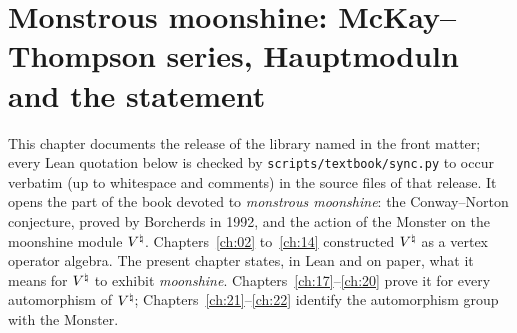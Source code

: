 \chapter{Monstrous moonshine: McKay--Thompson series, Hauptmoduln and the statement}\label{ch:16}

\providecommand{\chsixteenH}{\mathbb{H}}
\providecommand{\chsixteenR}{\mathbb{R}}
\providecommand{\chsixteenM}{\mathbb{M}}
\providecommand{\chsixteenSL}{\mathrm{SL}_2(\mathbb{Z})}
\providecommand{\chsixteenSLR}{\mathrm{SL}_2(\mathbb{R})}
\providecommand{\chsixteenGLR}{\mathrm{GL}_2(\mathbb{R})}
\providecommand{\chsixteenP}{\mathbb{P}^1}
\providecommand{\chsixteenX}{X(\Gamma)}
\providecommand{\chsixteenT}{T_g}
\providecommand{\chsixteenmat}[4]{\left(\begin{smallmatrix}#1&#2\\#3&#4\end{smallmatrix}\right)}
\providecommand{\chsixteenlean}[1]{\texttt{\directlua{ local s = "\luaescapestring{\detokenize{#1}}" for piece, sep in string.gmatch(s, "([^_.]*)([_.]?)") do if not (piece == "" and sep == "") then tex.sprint(-2, piece .. sep) if not (sep == "") then tex.sprint(string.char(92) .. "allowbreak{}") end end end}}}
\begingroup\setlength{\emergencystretch}{3em}\sloppy

This chapter documents the release of the library named in the front matter; every Lean quotation below is checked by
\texttt{scripts/textbook/sync.py} to occur verbatim (up to whitespace and comments) in the source files of that
release.  It
opens the part of the book devoted to \emph{monstrous moonshine}: the Conway--Norton conjecture, proved by
Borcherds in 1992, and the action of the Monster on the moonshine module ${V^{\natural}}$.  Chapters~\ref{ch:02}
to~\ref{ch:14} constructed ${V^{\natural}}$ as a vertex operator algebra.  The present chapter states, in Lean and on paper,
what it means for ${V^{\natural}}$ to exhibit \emph{moonshine}.  Chapters~\ref{ch:17}--\ref{ch:20} prove it for every
automorphism of ${V^{\natural}}$; Chapters~\ref{ch:21}--\ref{ch:22} identify the automorphism group with the Monster.

